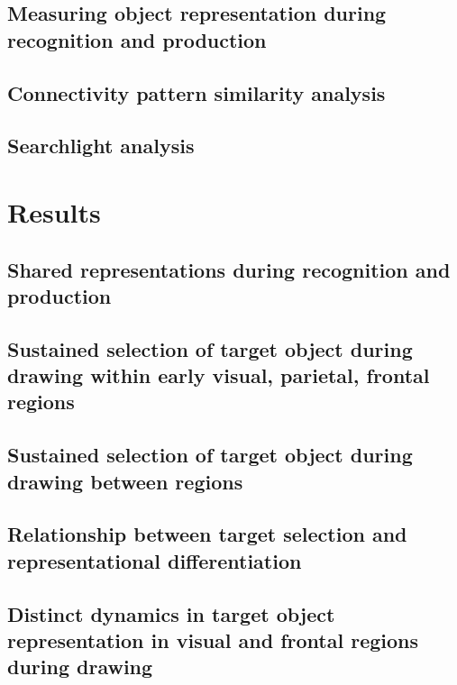 \documentclass[11pt,letterpaper]{article}
\begin{document}
\subsection*{Measuring object representation during recognition and production}

\subsection*{Connectivity pattern similarity analysis}

\subsection*{Searchlight analysis}

\section*{Results}

\subsection*{Shared representations during recognition and production}

\subsection*{Sustained selection of target object during drawing within early visual, parietal, frontal regions}

\subsection*{Sustained selection of target object during drawing between regions}

\subsection*{Relationship between target selection and representational differentiation}

\subsection*{Distinct dynamics in target object representation in visual and frontal regions during drawing}
\end{document}
